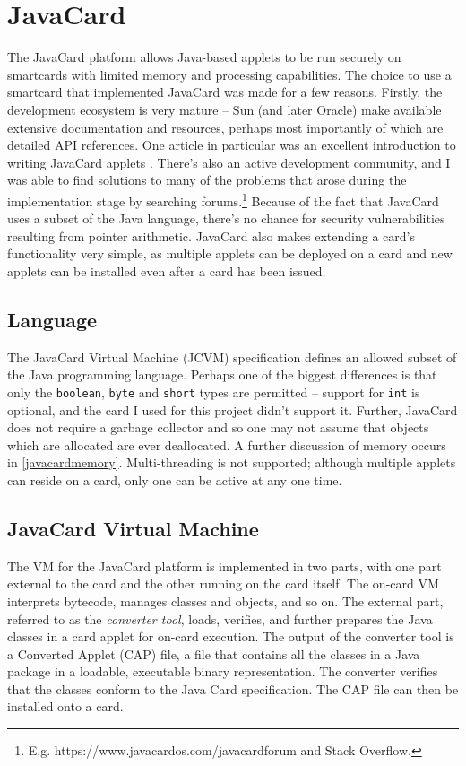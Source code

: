 \documentclass[12pt,a4paper,twoside,openright]{report}
\begin{document}
\section{JavaCard}

The JavaCard platform allows Java-based applets to be run securely on smartcards with limited memory and processing capabilities. The choice to use a smartcard that implemented JavaCard was made for a few reasons. Firstly, the development ecosystem is very mature -- Sun (and later Oracle) make available extensive documentation and resources, perhaps most importantly of which are detailed API references. One article in particular was an excellent introduction to writing JavaCard applets \cite{writingapplets}. There's also an active development community, and I was able to find solutions to many of the problems that arose during the implementation stage by searching forums.\footnote{E.g. https://www.javacardos.com/javacardforum and Stack Overflow.} Because of the fact that JavaCard uses a subset of the Java language, there's no chance for security vulnerabilities resulting from pointer arithmetic. JavaCard also makes extending a card's functionality very simple, as multiple applets can be deployed on a card and new applets can be installed even after a card has been issued.

\subsection{Language}

The JavaCard Virtual Machine (JCVM) specification defines an allowed subset of the Java programming language. Perhaps one of the biggest differences is that only the \texttt{boolean}, \texttt{byte} and \texttt{short} types are permitted -- support for \texttt{int} is optional, and the card I used for this project didn't support it. Further, JavaCard does not require a garbage collector and so one may not assume that objects which are allocated are ever deallocated. A further discussion of memory occurs in \autoref{javacardmemory}. Multi-threading is not supported; although multiple applets can reside on a card, only one can be active at any one time.

\subsection{JavaCard Virtual Machine}

The VM for the JavaCard platform is implemented in two parts, with one part external to the card and the other running on the card itself. The on-card VM interprets bytecode, manages classes and objects, and so on. The external part, referred to as the \emph{converter tool}, loads, verifies, and further prepares the Java classes in a card applet for on-card execution. The output of the converter tool is a Converted Applet (CAP) file, a file that contains all the classes in a Java package in a loadable, executable binary representation. The converter verifies that the classes conform to the Java Card specification. The CAP file can then be installed onto a card.
\end{document}
